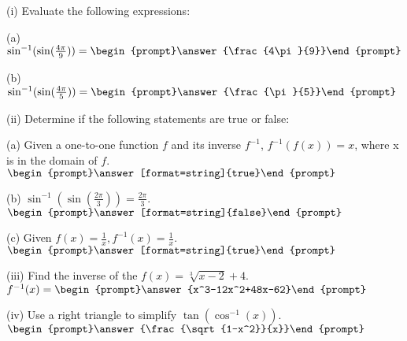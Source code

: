 \documentclass{ximera}
\author{Tom Dinitz and Nela Lakos}
\begin{document}
\begin{exercise}

  (i) Evaluate the following expressions:

  (a) $\sin^{-1}(\sin(\frac{4\pi}{9}))=\begin{prompt}\answer{\frac{4\pi}{9}}\end{prompt}$

  (b) $\sin^{-1}(\sin(\frac{4\pi}{5}))=\begin{prompt}\answer{\frac{\pi}{5}}\end{prompt}$

  (ii) Determine if the following statements are true or false:

  (a) Given a one-to-one function $f$ and its inverse $f^{-1}$, $f^{-1}(f(x))=x$,
  where x is in the domain of $f$. $\begin{prompt}\answer[format=string]{true}\end{prompt}$

  (b) $\sin^{-1}(\sin(\frac{2\pi}{3}))=\frac{2\pi}{3}$. $\begin{prompt}\answer[format=string]{false}\end{prompt}$

  (c) Given $f(x)=\frac{1}{x}, f^{-1}(x)=\frac{1}{x}$. $\begin{prompt}\answer[format=string]{true}\end{prompt}$

  (iii) Find the inverse of the $f(x)=\sqrt[3]{x-2}+4$. $f^{-1}(x)=\begin{prompt}\answer{x^3-12x^2+48x-62}\end{prompt}$

  (iv) Use a right triangle to simplify $\tan(\cos^{-1}(x))$. $\begin{prompt}\answer{\frac{\sqrt{1-x^2}}{x}}\end{prompt}$
\end{exercise}
\end{document}
